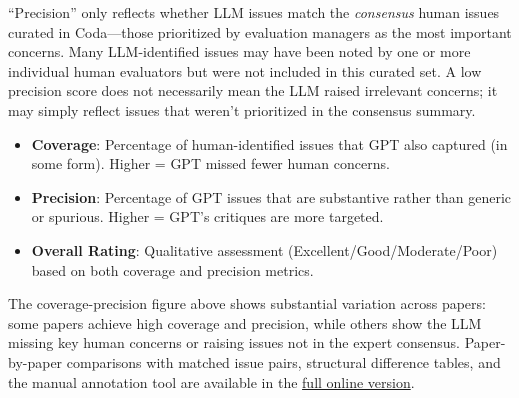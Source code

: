 \documentclass[
  11pt,
  letterpaper,
]{article}
\providecommand{\tightlist}{%
  \setlength{\itemsep}{0pt}\setlength{\parskip}{0pt}}
\begin{document}
\begin{tcolorbox}[enhanced jigsaw, toptitle=1mm, breakable, opacityback=0, colback=white, rightrule=.15mm, opacitybacktitle=0.6, colbacktitle=quarto-callout-note-color!10!white, bottomrule=.15mm, leftrule=.75mm, colframe=quarto-callout-note-color-frame, coltitle=black, bottomtitle=1mm, titlerule=0mm, arc=.35mm, title=\textcolor{quarto-callout-note-color}{\faInfo}\hspace{0.5em}{Caveat on Precision}, toprule=.15mm, left=2mm]

``Precision'' only reflects whether LLM issues match the
\emph{consensus} human issues curated in Coda---those prioritized by
evaluation managers as the most important concerns. Many LLM-identified
issues may have been noted by one or more individual human evaluators
but were not included in this curated set. A low precision score does
not necessarily mean the LLM raised irrelevant concerns; it may simply
reflect issues that weren't prioritized in the consensus summary.

\end{tcolorbox}

\begin{tcolorbox}[enhanced jigsaw, toptitle=1mm, breakable, opacityback=0, colback=white, rightrule=.15mm, opacitybacktitle=0.6, colbacktitle=quarto-callout-note-color!10!white, bottomrule=.15mm, leftrule=.75mm, colframe=quarto-callout-note-color-frame, coltitle=black, bottomtitle=1mm, titlerule=0mm, arc=.35mm, title=\textcolor{quarto-callout-note-color}{\faInfo}\hspace{0.5em}{Interpretation Guide}, toprule=.15mm, left=2mm]

\begin{itemize}
\tightlist
\item
  \textbf{Coverage}: Percentage of human-identified issues that GPT also
  captured (in some form). Higher = GPT missed fewer human concerns.
\item
  \textbf{Precision}: Percentage of GPT issues that are substantive
  rather than generic or spurious. Higher = GPT's critiques are more
  targeted.
\item
  \textbf{Overall Rating}: Qualitative assessment
  (Excellent/Good/Moderate/Poor) based on both coverage and precision
  metrics.
\end{itemize}

\end{tcolorbox}

The coverage-precision figure above shows substantial variation across
papers: some papers achieve high coverage and precision, while others
show the LLM missing key human concerns or raising issues not in the
expert consensus. Paper-by-paper comparisons with matched issue pairs,
structural difference tables, and the manual annotation tool are
available in the
\href{https://llm-uj-research-eval.netlify.app/results_critiques.html}{full
online version}.
\end{document}
